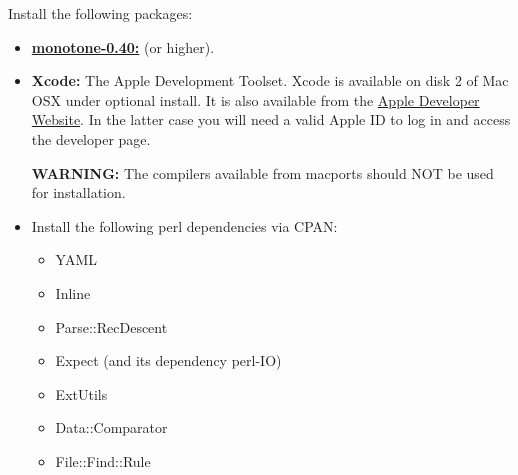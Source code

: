 \documentclass[12pt]{article}
\begin{document}
Install the following packages:
\begin{itemize}
   \item[]\href{http://monotone.ca/}{\bf monotone-0.40:} (or higher).
   \item[]{\bf Xcode:} The Apple Development Toolset. Xcode is available on disk 2 of Mac OSX under optional install. It is also available from the \href{http://developer.apple.com/technology/xcode.html}{Apple Developer Website}. In the latter case  you will need a valid Apple ID to log in and access the developer page.
   
   {\bf WARNING:} The compilers available from macports should NOT be used for installation.
   \item[]Install the following perl dependencies via CPAN:
      \begin{itemize}
         \item YAML
         \item Inline
         \item Parse::RecDescent
         \item Expect (and its dependency perl-IO)
         \item ExtUtils
         \item Data::Comparator
         \item File::Find::Rule
      \end{itemize}
   \end{itemize}
   
\end{document}
